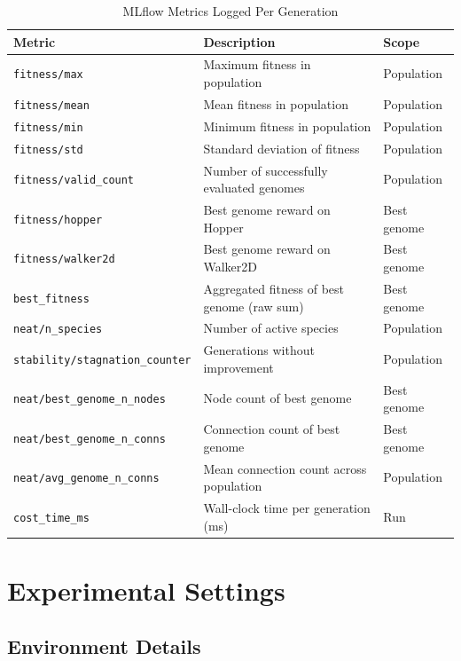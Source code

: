 \documentclass[12pt]{article}
\begin{document}
\begin{table}[h]
\centering
\caption{MLflow Metrics Logged Per Generation}
\label{tab:mlflow_metrics}
\begin{tabular}{lll}
\toprule
\textbf{Metric} & \textbf{Description} & \textbf{Scope} \\
\midrule
\texttt{fitness/max}          & Maximum fitness in population          & Population \\
\texttt{fitness/mean}         & Mean fitness in population             & Population \\
\texttt{fitness/min}          & Minimum fitness in population          & Population \\
\texttt{fitness/std}          & Standard deviation of fitness          & Population \\
\texttt{fitness/valid\_count} & Number of successfully evaluated genomes & Population \\
\texttt{fitness/hopper}       & Best genome reward on Hopper           & Best genome \\
\texttt{fitness/walker2d}     & Best genome reward on Walker2D         & Best genome \\
\texttt{best\_fitness}        & Aggregated fitness of best genome (raw sum) & Best genome \\
\texttt{neat/n\_species}      & Number of active species               & Population \\
\texttt{stability/stagnation\_counter} & Generations without improvement & Population \\
\texttt{neat/best\_genome\_n\_nodes}  & Node count of best genome       & Best genome \\
\texttt{neat/best\_genome\_n\_conns}  & Connection count of best genome & Best genome \\
\texttt{neat/avg\_genome\_n\_conns}   & Mean connection count across population & Population \\
\texttt{cost\_time\_ms}       & Wall-clock time per generation (ms)    & Run \\
\bottomrule
\end{tabular}
\end{table}

\section{Experimental Settings}

\subsection{Environment Details}
\end{document}
